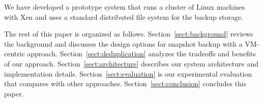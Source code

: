 We have developed a prototype system that runs a cluster of Linux machines with Xen and uses 
a standard distributed file system for the backup storage. 

The rest of this paper is organized as follows.
Section~\ref{sect:background} reviews the background and discusses the  design options for snapshot backup 
with a VM-centric approach. 
Section~\ref{sect:deduplication}  analyzes the tradeoffs and benefits of our approach. 
Section~\ref{sect:architecture}  describes our system architecture and implementation details.
Section~\ref{sect:evaluation} is our experimental evaluation that compares with other approaches.
Section~\ref{sect:conclusion}  concludes this paper.
